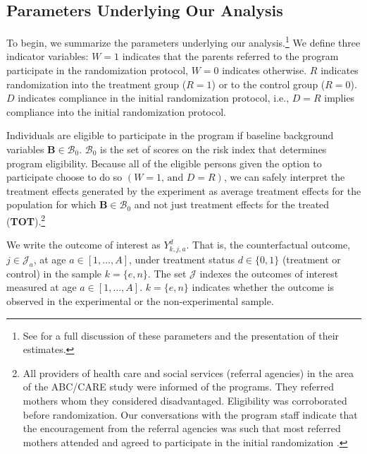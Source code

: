 \subsection{Parameters Underlying Our Analysis}
\label{section:methodsquestions}

To begin, we summarize the parameters underlying our analysis.\footnote{See \citet{Garcia_Heckman_Ziff_2017_Gender-Diff_UNPUBLISHED} for a full discussion of these parameters and the presentation of their estimates.} We define three indicator variables: $W = 1$ indicates that the parents referred to the program participate in the randomization protocol, $W = 0$ indicates otherwise. $R$ indicates randomization into the treatment group ($R = 1$) or to the control group ($R = 0$). $D$ indicates compliance in the initial randomization protocol, i.e., $D = R$ implies compliance into the initial randomization protocol.

Individuals are eligible to participate in the program if baseline background variables $\bm{B}\in\mathcal{B}_0$. $\mathcal{B}_0$ is the set of scores on the risk index that determines program eligibility. Because all of the eligible persons given the option to participate choose to do so $(W=1\text{, and } D=R)$, we can safely interpret the treatment effects generated by the experiment as average treatment effects for the population for which $\bm{B}\in\mathcal{B}_0$ and not just treatment effects for the treated (\textbf{TOT}).\footnote{All providers of health care and social services (referral agencies) in the area of the ABC/CARE study were informed of the programs. They referred mothers whom they considered disadvantaged. Eligibility was corroborated before randomization. Our conversations with the program staff indicate that the encouragement from the referral agencies was such that most referred mothers attended and agreed to participate in the initial randomization \citep{Ramey-etal_2012-ABC}.}

We write the outcome of interest as $Y_{k,j,a}^d$. That is, the counterfactual outcome, $j \in \mathcal{J}_a$, at age $a \in [1, \ldots, A]$, under treatment status $d \in \{0, 1\}$ (treatment or control) in the sample $k = \{e, n \}$. The set $\mathcal{J}$ indexes the outcomes of interest measured at age $a \in [1, \ldots, A]$. $k = \{e, n\}$ indicates whether the outcome is observed in the experimental or the non-experimental sample. 

